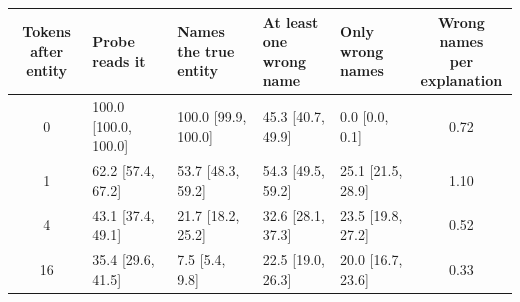\begin{tabular}{@{}cllllc@{}}
\toprule
\shortstack[l]{Tokens after\\entity} & Probe reads it & \shortstack[l]{Names the true\\entity} & \shortstack[l]{At least one\\wrong name} & \shortstack[l]{Only wrong\\names} & \shortstack[l]{Wrong names\\per\\explanation} \\
\midrule
0 & 100.0 {\scriptsize[100.0, 100.0]} & 100.0 {\scriptsize[99.9, 100.0]} & 45.3 {\scriptsize[40.7, 49.9]} & 0.0 {\scriptsize[0.0, 0.1]} & 0.72 \\
1 & 62.2 {\scriptsize[57.4, 67.2]} & 53.7 {\scriptsize[48.3, 59.2]} & 54.3 {\scriptsize[49.5, 59.2]} & 25.1 {\scriptsize[21.5, 28.9]} & 1.10 \\
4 & 43.1 {\scriptsize[37.4, 49.1]} & 21.7 {\scriptsize[18.2, 25.2]} & 32.6 {\scriptsize[28.1, 37.3]} & 23.5 {\scriptsize[19.8, 27.2]} & 0.52 \\
16 & 35.4 {\scriptsize[29.6, 41.5]} & 7.5 {\scriptsize[5.4, 9.8]} & 22.5 {\scriptsize[19.0, 26.3]} & 20.0 {\scriptsize[16.7, 23.6]} & 0.33 \\
\bottomrule
\end{tabular}
